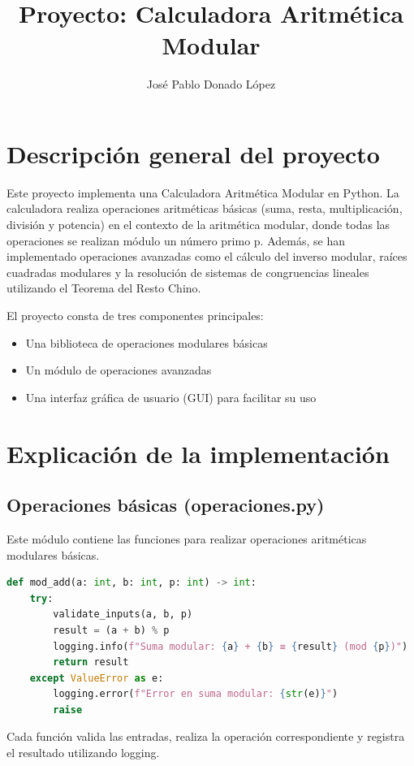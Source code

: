 \documentclass{article}
\title{Proyecto: Calculadora Aritmética Modular}
\author{José Pablo Donado López}
\date{}
\begin{document}
\maketitle

\section{Descripción general del proyecto}

Este proyecto implementa una Calculadora Aritmética Modular en Python. La calculadora realiza operaciones aritméticas básicas (suma, resta, multiplicación, división y potencia) en el contexto de la aritmética modular, donde todas las operaciones se realizan módulo un número primo p. Además, se han implementado operaciones avanzadas como el cálculo del inverso modular, raíces cuadradas modulares y la resolución de sistemas de congruencias lineales utilizando el Teorema del Resto Chino.

El proyecto consta de tres componentes principales:
\begin{itemize}
    \item Una biblioteca de operaciones modulares básicas
    \item Un módulo de operaciones avanzadas
    \item Una interfaz gráfica de usuario (GUI) para facilitar su uso
\end{itemize}

\section{Explicación de la implementación}

\subsection{Operaciones básicas (operaciones.py)}

Este módulo contiene las funciones para realizar operaciones aritméticas modulares básicas.

\begin{lstlisting}[language=Python]
def mod_add(a: int, b: int, p: int) -> int:
    try:
        validate_inputs(a, b, p)
        result = (a + b) % p
        logging.info(f"Suma modular: {a} + {b} ≡ {result} (mod {p})")
        return result
    except ValueError as e:
        logging.error(f"Error en suma modular: {str(e)}")
        raise
\end{lstlisting}

Cada función valida las entradas, realiza la operación correspondiente y registra el resultado utilizando logging.
\end{document}
